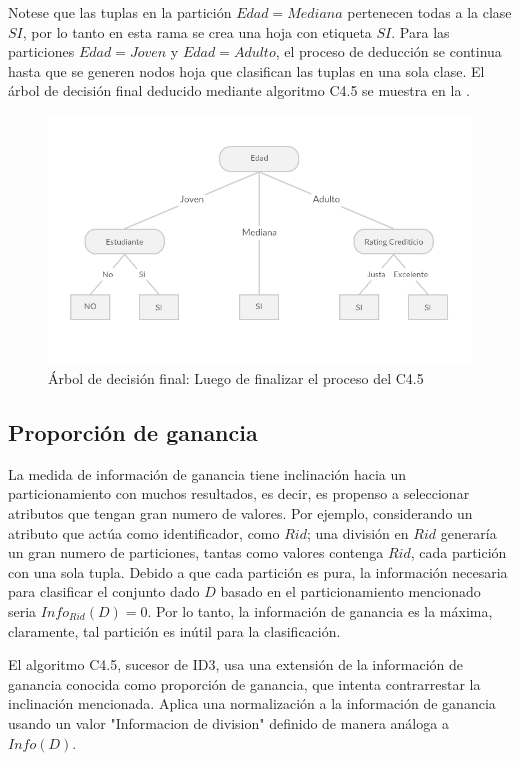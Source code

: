 Notese que las tuplas en la partición $Edad = Mediana$ pertenecen todas a la clase $SI$, por lo tanto en esta rama se crea una hoja con etiqueta $SI$. Para las particiones $Edad = Joven$ y $Edad = Adulto$, el proceso de deducción se continua hasta que se generen nodos hoja que clasifican las tuplas en una sola clase. El
 árbol de decisión final deducido mediante algoritmo C4.5 se muestra en la .
 
\begin{figure}[!tbph]
	\centering
	\includegraphics[width=0.7\linewidth]{capitulo-3/graphics/dtree_parti_final}
	\caption[Árbol de decisión Final]{\label{fig:arbolFinal}Árbol de decisión final: Luego de finalizar el proceso del C4.5 }
\end{figure}


\subsection{Proporción de ganancia}
La medida de información de ganancia tiene inclinación hacia un particionamiento con muchos resultados, es decir, es propenso a seleccionar atributos que tengan gran numero de valores. Por ejemplo, considerando un atributo que actúa como identificador, como $Rid$; una división en $Rid$ generaría un gran numero de particiones, tantas como valores contenga $Rid$, cada partición con una sola tupla. Debido a que cada partición es pura, la información necesaria para clasificar el conjunto dado $D$ basado en el particionamiento mencionado seria $Info_{Rid}(D)=0$. Por lo tanto, la información de ganancia es la máxima, claramente, tal partición es inútil para la clasificación. 

El algoritmo C4.5, sucesor de ID3, usa una extensión de la información de ganancia conocida como proporción de ganancia, que intenta contrarrestar la inclinación mencionada.	Aplica una normalización a la información de ganancia usando un valor "Informacion de division" definido de manera análoga a $Info(D)$.

